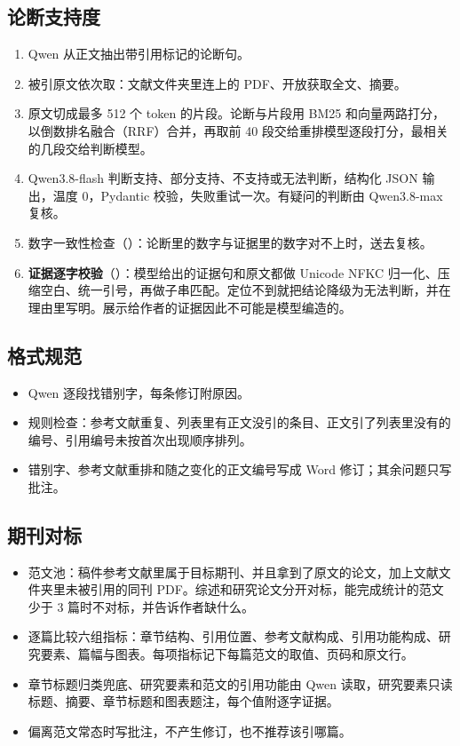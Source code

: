 \documentclass[UTF8,zihao=5,fontset=none]{ctexart}
\begin{document}
\subsection{论断支持度}

\begin{enumerate}
\item Qwen 从正文抽出带引用标记的论断句。
\item 被引原文依次取：文献文件夹里连上的 PDF、开放获取全文、摘要。
\item 原文切成最多 512 个 token 的片段。论断与片段用 BM25 和向量两路打分，以倒数排名融合（RRF）合并，再取前 40 段交给重排模型逐段打分，最相关的几段交给判断模型。
\item Qwen3.8-flash 判断支持、部分支持、不支持或无法判断，结构化 JSON 输出，温度 0，Pydantic 校验，失败重试一次。有疑问的判断由 Qwen3.8-max 复核。
\item 数字一致性检查（）：论断里的数字与证据里的数字对不上时，送去复核。
\item \textbf{证据逐字校验}（）：模型给出的证据句和原文都做 Unicode NFKC 归一化、压缩空白、统一引号，再做子串匹配。定位不到就把结论降级为无法判断，并在理由里写明。展示给作者的证据因此不可能是模型编造的。
\end{enumerate}


\subsection{格式规范}

\begin{itemize}
\item Qwen 逐段找错别字，每条修订附原因。
\item 规则检查：参考文献重复、列表里有正文没引的条目、正文引了列表里没有的编号、引用编号未按首次出现顺序排列。
\item 错别字、参考文献重排和随之变化的正文编号写成 Word 修订；其余问题只写批注。
\end{itemize}

\subsection{期刊对标}

\begin{itemize}
\item 范文池：稿件参考文献里属于目标期刊、并且拿到了原文的论文，加上文献文件夹里未被引用的同刊 PDF。综述和研究论文分开对标，能完成统计的范文少于 3 篇时不对标，并告诉作者缺什么。
\item 逐篇比较六组指标：章节结构、引用位置、参考文献构成、引用功能构成、研究要素、篇幅与图表。每项指标记下每篇范文的取值、页码和原文行。
\item 章节标题归类兜底、研究要素和范文的引用功能由 Qwen 读取，研究要素只读标题、摘要、章节标题和图表题注，每个值附逐字证据。
\item 偏离范文常态时写批注，不产生修订，也不推荐该引哪篇。
\end{itemize}
\end{document}
